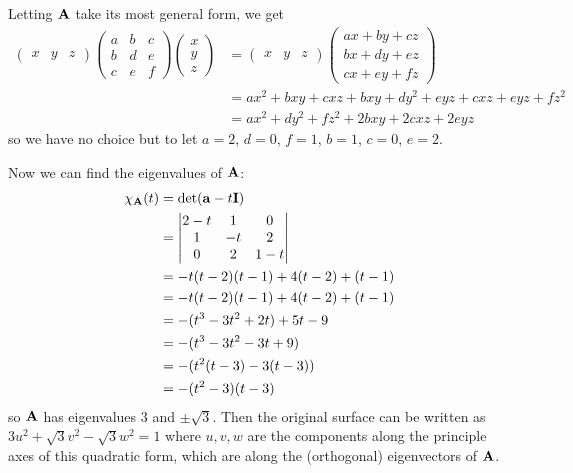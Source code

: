 \documentclass[fleqn,a4paper,11pt]{article}
\begin{document}
\begin{enumerate}[label=\textbf{\arabic*.}]
  Letting \(\mathbf{A}\) take its most general form, we get
  \begin{align*}
   \begin{pmatrix} x & y & z \end{pmatrix}
   \begin{pmatrix}
    a & b & c \\
    b & d & e \\
    c & e & f
   \end{pmatrix}
   \begin{pmatrix} x \\ y \\ z \end{pmatrix}
   &=
   \begin{pmatrix} x & y & z \end{pmatrix}
   \begin{pmatrix}
    ax + by + cz \\
    bx + dy + ez \\
    cx + ey + fz
   \end{pmatrix} \\
   &= ax^2 + bxy + cxz + bxy + dy^2 + eyz + cxz + eyz + fz^2 \\
   &= ax^2 + dy^2 + fz^2 + 2bxy + 2cxz + 2eyz
  \end{align*}
  so we have no choice but to let
  \(a = 2\), \(d = 0\), \(f = 1\), \(b = 1\), \(c = 0\), \(e = 2\).

  Now we can find the eigenvalues of \(\mathbf{A}\):
  \begin{align*}
   \chi_{\mathbf{A}}(t)
   &= \det(\mathbf{a} - t\mathbf{I}) \\
   &=
   \begin{vmatrix}
    2 - t & 1 & 0 \\
    1 & -t & 2 \\
    0 & 2 & 1 - t
   \end{vmatrix} \\
   &= -t(t - 2)(t - 1) + 4(t - 2) + (t - 1) \\
   &= -t(t - 2)(t - 1) + 4(t - 2) + (t - 1) \\
   &= -(t^3 - 3t^2 + 2t) + 5t - 9 \\
   &= -(t^3 - 3t^2 - 3t + 9) \\
   &= -(t^2(t - 3) - 3(t - 3)) \\
   &= -(t^2 - 3)(t - 3)
  \end{align*}
  so \(\mathbf{A}\) has eigenvalues \(3\) and \(\pm \sqrt 3\). Then the original
  surface can be written as
  \(3u^2 + \sqrt 3 v^2 - \sqrt 3 w^2 = 1\) where \(u, v, w\) are the components
  along the principle axes of this quadratic form, which are along the
  (orthogonal) eigenvectors of \(\mathbf{A}\).


\end{enumerate}
\end{document}
